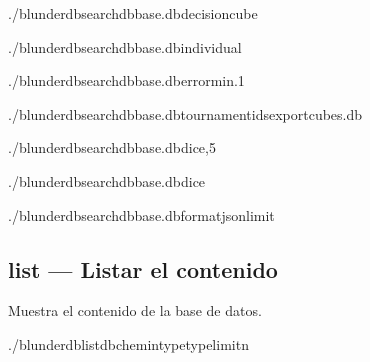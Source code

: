\documentclass[letterpaper,10pt,spanish]{sphinxmanual}
\begin{document}
\sphinxAtStartPar
{}

\begin{sphinxVerbatim}[commandchars=\\\{\}]
./blunderdbsearch\PYGZhy{}\PYGZhy{}dbbase.db\PYGZhy{}\PYGZhy{}decisioncube

./blunderdbsearch\PYGZhy{}\PYGZhy{}dbbase.db\PYGZhy{}\PYGZhy{}individual

./blunderdbsearch\PYGZhy{}\PYGZhy{}dbbase.db\PYGZhy{}\PYGZhy{}error\PYGZhy{}min.1

./blunderdbsearch\PYGZhy{}\PYGZhy{}dbbase.db\PYGZhy{}\PYGZhy{}tournament\PYGZhy{}ids\PYGZhy{}\PYGZhy{}exportcubes.db

./blunderdbsearch\PYGZhy{}\PYGZhy{}dbbase.db\PYGZhy{}\PYGZhy{}dice,5

./blunderdbsearch\PYGZhy{}\PYGZhy{}dbbase.db\PYGZhy{}\PYGZhy{}dice

./blunderdbsearch\PYGZhy{}\PYGZhy{}dbbase.db\PYGZhy{}\PYGZhy{}formatjson\PYGZhy{}\PYGZhy{}limit
\end{sphinxVerbatim}


\subsection{list — Listar el contenido}
\label{\detokenize{cli:list-lister-le-contenu}}
\sphinxAtStartPar
Muestra el contenido de la base de datos.

\begin{sphinxVerbatim}[commandchars=\\\{\}]
./blunderdblist\PYGZhy{}\PYGZhy{}db\PYGZlt{}chemin\PYGZgt{}\PYGZhy{}\PYGZhy{}type\PYGZlt{}type\PYGZgt{}\PYG{o}{[}\PYGZhy{}\PYGZhy{}limit\PYGZlt{}n\PYGZgt{}\PYG{o}{]}
\end{sphinxVerbatim}
\end{document}

